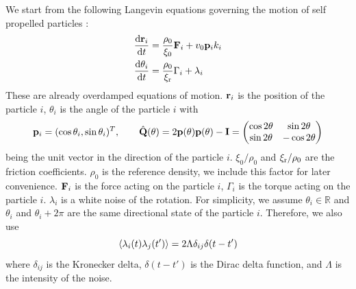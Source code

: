 \documentclass[a5paper]{article}
\begin{document}
We start from the following Langevin equations governing the motion of self propelled particles \cite{cugliandolo2015,bertin2013}:
\begin{subequations}
    \label{langevin-equations}
\begin{align}
    \frac{\mathrm{d}\mathbf{r}_i}{\mathrm{d} t}&=\frac{\rho_0}{\xi_0}\mathbf{F}_i+v_0 \mathbf{p}_i k_i
    \label{langevin-equations-position}
    \\
    \label{langevin-equations-angle}
    \frac{\mathrm{d}\theta_i}{\mathrm{d} t}&=\frac{\rho_0}{\xi_{\rm r}}\Gamma_i+\lambda_i
\end{align}
\end{subequations}
These are already overdamped equations of motion.
$\mathbf{r}_i$ is the position of the particle $i$, $\theta_i$ is the angle of the particle $i$ with 
\begin{align}
    \mathbf{p}_i = (\cos \theta_i, \sin \theta_i)^T,
    \qquad
    \label{Q-unit-def}
    \hat{\mathbf{Q}}(\theta) = 
    2 \mathbf{p}(\theta)\mathbf{p}(\theta) - \mathbf{I} =  \begin{pmatrix}
        \cos 2\theta & \sin 2\theta
        \\
        \sin 2\theta & -\cos 2\theta
    \end{pmatrix}
\end{align}
being the unit vector in the direction of the particle $i$. $\xi_0/\rho_0$ and $\xi_{\rm r}/\rho_0$ are the friction coefficients. $\rho_0$ is the reference density, we include this factor for later convenience.
$\mathbf{F}_i$ is the force acting on the particle $i$, $\Gamma_i$ is the torque acting on the particle $i$. $\lambda_i$ is a white noise of the rotation.
For simplicity, we assume $\theta_i \in \mathbb{R}$ and $\theta_i$ and $\theta_i+2\pi$ are the same directional state of the particle $i$. Therefore, we also use 
\begin{equation}
    \left\langle \lambda_i(t) \lambda_j(t') \right\rangle = 2 \Lambda \delta_{ij} \delta(t-t')
\end{equation}
where $\delta_{ij}$ is the Kronecker delta, $\delta(t-t')$ is the Dirac delta function, and $\Lambda$ is the intensity of the noise.
\end{document}
